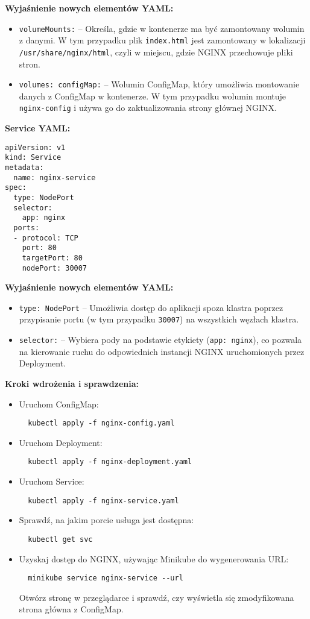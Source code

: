 \documentclass{article}
\begin{document}
\textbf{Wyjaśnienie nowych elementów YAML:}
\begin{itemize}
  \item \texttt{volumeMounts:} – Określa, gdzie w kontenerze ma być zamontowany wolumin z danymi. W tym przypadku plik \texttt{index.html} jest zamontowany w lokalizacji \texttt{/usr/share/nginx/html}, czyli w miejscu, gdzie NGINX przechowuje pliki stron.
  \item \texttt{volumes: configMap:} – Wolumin ConfigMap, który umożliwia montowanie danych z ConfigMap w kontenerze. W tym przypadku wolumin montuje \texttt{nginx-config} i używa go do zaktualizowania strony głównej NGINX.
\end{itemize}

\textbf{Service YAML:}
\begin{lstlisting}
apiVersion: v1
kind: Service
metadata:
  name: nginx-service
spec:
  type: NodePort
  selector:
    app: nginx
  ports:
  - protocol: TCP
    port: 80
    targetPort: 80
    nodePort: 30007
\end{lstlisting}

\textbf{Wyjaśnienie nowych elementów YAML:}
\begin{itemize}
  \item \texttt{type: NodePort} – Umożliwia dostęp do aplikacji spoza klastra poprzez przypisanie portu (w tym przypadku \texttt{30007}) na wszystkich węzłach klastra.
  \item \texttt{selector:} – Wybiera pody na podstawie etykiety (\texttt{app: nginx}), co pozwala na kierowanie ruchu do odpowiednich instancji NGINX uruchomionych przez Deployment.
\end{itemize}

\textbf{Kroki wdrożenia i sprawdzenia:}
\begin{itemize}
  \item Uruchom ConfigMap:
  \begin{lstlisting}
  kubectl apply -f nginx-config.yaml
  \end{lstlisting}
  \item Uruchom Deployment:
  \begin{lstlisting}
  kubectl apply -f nginx-deployment.yaml
  \end{lstlisting}
  \item Uruchom Service:
  \begin{lstlisting}
  kubectl apply -f nginx-service.yaml
  \end{lstlisting}
  \item Sprawdź, na jakim porcie usługa jest dostępna:
  \begin{lstlisting}
  kubectl get svc
  \end{lstlisting}
  \item Uzyskaj dostęp do NGINX, używając Minikube do wygenerowania URL:
  \begin{lstlisting}
  minikube service nginx-service --url
  \end{lstlisting}
  Otwórz stronę w przeglądarce i sprawdź, czy wyświetla się zmodyfikowana strona główna z ConfigMap.
\end{itemize}
\end{document}
